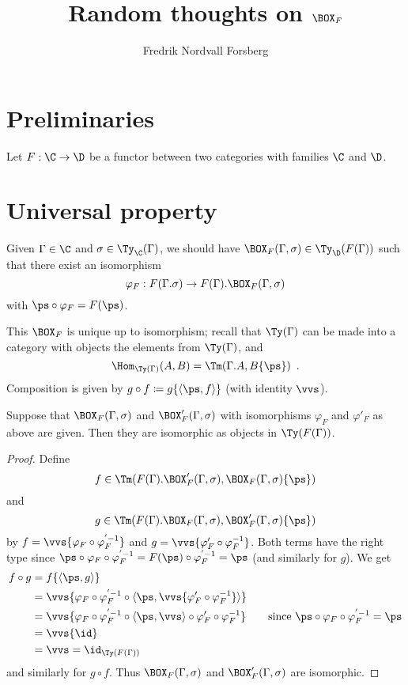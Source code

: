 \documentclass{article}
\title{Random thoughts on $\BOX_F$}
\author{Fredrik Nordvall Forsberg}
\begin{document}
\maketitle

\section{Preliminaries}

Let $F : \C \to \D$ be a functor between two categories with families
$\C$ and $\D$.

\section{Universal property}

Given $\Gamma \in \C$ and $\sigma \in \Ty_{\C}(\Gamma)$, we should
have $\BOX_F(\Gamma, \sigma) \in \Ty_{\D}(F(\Gamma))$ such that
there exist an isomorphism
\[
\varphi_F : F(\Gamma . \sigma) \to F(\Gamma).\BOX_F(\Gamma, \sigma)
\]
with $\ps \circ \varphi_F = F(\ps)$.

This $\BOX_F$ is unique up to isomorphism; recall that
$\Ty(\Gamma)$ can be made into a category with objects the elements
from $\Ty(\Gamma)$, and 
\[
\Hom_{\Ty(\Gamma)}(A, B) = \Tm(\Gamma . A, B\{\ps\}) \enspace .
\]
Composition is given by $g \circ f \coloneqq g\{\langle \ps,
f\rangle\}$ (with identity $\vvs$).

\begin{proposition}
\label{thm:box_uni}
  Suppose that $\BOX_F(\Gamma, \sigma)$ and $\BOX'_F(\Gamma,
  \sigma)$ with isomorphisms $\varphi_F$ and $\varphi'_F$ as above are
  given. Then they are isomorphic as objects in $\Ty(F(\Gamma))$.
\end{proposition}
\begin{proof}
Define
 \[f \in \Tm(F(\Gamma).\BOX'_F(\Gamma, \sigma),\BOX_F(\Gamma, \sigma)\{\ps\})\]
and
\[g \in \Tm(F(\Gamma).\BOX_F(\Gamma, \sigma),\BOX'_F(\Gamma,
\sigma)\{\ps\})\]
by $f = \vvs\{\varphi_F \circ \varphi_F^{'-1}\}$ and
$g = \vvs\{\varphi'_F \circ \varphi_F^{-1}\}$. Both terms have the
right type since $\ps \circ \varphi_F \circ \varphi_F^{'-1} = F(\ps)
\circ \varphi_F^{'-1} = \ps$ (and similarly for $g$). We get
\begin{align*}
  f \circ g &= f\{\langle \ps, g\rangle\} \\
  &= \vvs\{\varphi_F \circ \varphi_F^{'-1} \circ \langle \ps, \vvs\{\varphi'_F \circ \varphi_F^{-1}\}\rangle\} \\
  &= \vvs\{\varphi_F \circ \varphi_F^{'-1} \circ \langle \ps, \vvs \rangle \circ \varphi'_F \circ \varphi_F^{-1}\} \qquad \text{since $\ps \circ \varphi_F \circ \varphi_F^{'-1} = \ps$}\\
  &= \vvs\{\id\} \\
  &= \vvs = \id_{\Ty(F(\Gamma))}
\end{align*}
and similarly for $g \circ f$. Thus $\BOX_F(\Gamma, \sigma)$ and
$\BOX'_F(\Gamma, \sigma)$ are isomorphic.
\end{proof}
\end{document}
